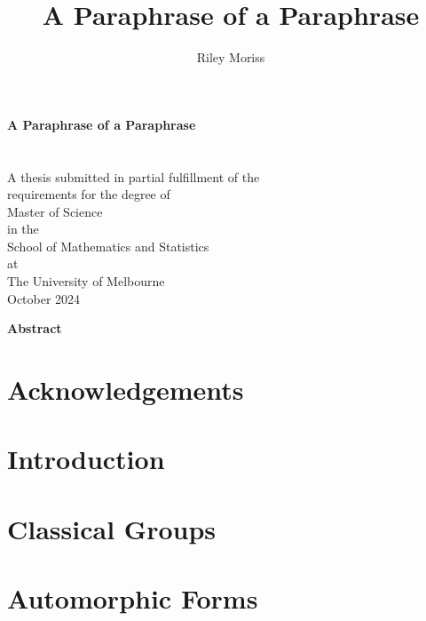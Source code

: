 \documentclass[12pt, openany]{book}
\title{A Paraphrase of a Paraphrase}
\author{Riley Moriss}
\numberwithin{equation}{section}
\begin{document}
    \begin{titlepage}
    \begin{center}
    \vspace*{1cm}
    \huge
    \textbf{A Paraphrase of a Paraphrase}\\
    \vspace{2cm}
    \Large
    \\
    \vspace{0.5cm}
    \\    
 
    A thesis submitted in partial fulfillment of the\\
    requirements for the degree of\\
    Master of Science\\
    in the\\
    School of Mathematics and Statistics\\
    at\\
    The University of Melbourne\\
    \vspace{1,5cm}
    October 2024
\end{center}
\end{titlepage}

\pagebreak





\begin{center}
	\textbf{Abstract}
\end{center}

\chapter*{Acknowledgements}

\chapter*{Introduction}


\tableofcontents
{}

\chapter{Classical Groups}

\chapter{Automorphic Forms}

\end{document}
